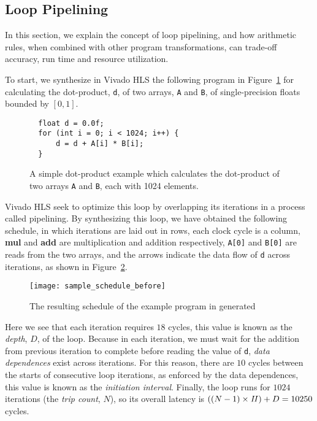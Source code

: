 \subsection{Loop Pipelining}
\label{bg:sub:loop_pipelining}

In this section, we explain the concept of loop pipelining, and how arithmetic
rules, when combined with other program transformations, can trade-off
accuracy, run time and resource utilization.

To start, we synthesize in Vivado HLS the following program in
Figure~\ref{bg:fig:dotprod} for calculating the dot-product, \verb|d|, of two
arrays, \verb|A| and \verb|B|, of single-precision floats bounded by $[0, 1]$.
\begin{figure}[ht]
\begin{lstlisting}
  float d = 0.0f;
  for (int i = 0; i < 1024; i++) {
      d = d + A[i] * B[i];
  }
\end{lstlisting}
    \caption{%
        A simple dot-product example which calculates the dot-product of two
        arrays \texttt{A} and \texttt{B}, each with 1024 elements.}
    \label{bg:fig:dotprod}
\end{figure}

Vivado HLS seek to optimize this loop by overlapping its iterations in a
process called pipelining.  By synthesizing this loop, we have obtained the
following schedule, in which iterations are laid out in rows, each clock cycle
is a column, \textbf{mul} and \textbf{add} are multiplication and addition
respectively, \verb|A[0]| and \verb|B[0]| are reads from the two arrays, and
the arrows indicate the data flow of \verb|d| across iterations, as shown in
Figure~\ref{bg:fig:sample_schedule_before}.
\begin{figure}[ht]
    \centering
    \texttt{[image: sample\_schedule\_before]}
    \caption{The resulting schedule of the example program in generated}
    \label{bg:fig:sample_schedule_before}
\end{figure}

Here we see that each iteration requires $18$ cycles, this value is known as
the \emph{depth}, $D$, of the loop.  Because in each iteration, we must wait
for the addition from previous iteration to complete before reading the value
of \verb|d|, \emph{data dependences} exist across iterations.  For this reason,
there are $10$ cycles between the starts of consecutive loop iterations, as
enforced by the data dependences, this value is known as the \emph{initiation
interval}.  Finally, the loop runs for $1024$ iterations (the \emph{trip
count}, $N$), so its overall latency is $((N-1)\times \mathit{II}) + D = 10250$ cycles.

